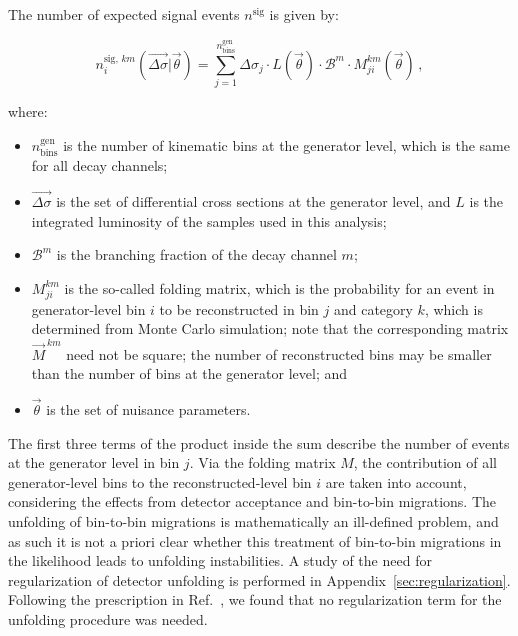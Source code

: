 The number of expected signal events $n^\text{sig}$ is given by:
% 
\begin{linenomath*}
\begin{equation}
n_i^{\text{sig},\,km}(\vec{\Delta\sigma} | \vec{\theta})
= \sum_{j=1}^{n_\text{bins}^\text{gen}}
    \Delta\sigma_j \cdot L(\vec{\theta})
     \cdot \mathcal{B}^{m}
     \cdot M_{ji}^{km}(\vec{\theta})
\,,
\label{eq:nsig}
\end{equation}
\end{linenomath*}
% 
where:
% 
\begin{itemize}
% 
\item $n_\text{bins}^\text{gen}$ is the number of kinematic bins at the generator level, which is the same for all decay channels;
% 
\item $\vec{\Delta\sigma}$ is the set of differential cross sections at the generator level, and $L$ is the integrated luminosity of the samples used in this analysis;
% 
\item $\mathcal{B}^m$ is the branching fraction of the decay channel $m$;
% 
\item $M_{ji}^{km}$ is the so-called folding matrix, which is the probability for an event in generator-level bin $i$ to be reconstructed in bin $j$ and category $k$, which is determined from Monte Carlo simulation;
% 
note that the corresponding matrix $\vec{M}^{\,km}$ need not be square; the number of reconstructed bins may be smaller than the number of bins at the generator level; and
% 
\item $\vec{\theta}$ is the set of nuisance parameters.
\end{itemize}
% 
The first three terms of the product inside the sum describe the number of events at the generator level in bin $j$.
% 
Via the folding matrix $M$, the contribution of all generator-level bins to the reconstructed-level bin $i$ are taken into account, considering the effects from detector acceptance and bin-to-bin migrations.
% 
The unfolding of bin-to-bin migrations is mathematically an ill-defined problem, and as such it is not a priori clear whether this treatment of bin-to-bin migrations in the likelihood leads to unfolding instabilities.
% 
A study of the need for regularization of detector unfolding is performed in Appendix~\ref{sec:regularization}.
% 
Following the prescription in Ref.~\cite{Hansen:LShape}, we found that no regularization term for the unfolding procedure was needed.


